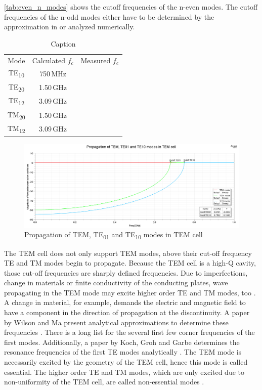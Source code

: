 \autoref{tab:even_n_modes} shows the cutoff frequencies of the n-even modes. The cutoff frequencies of the n-odd modes either have to be determined by the approximation in \cite{Wilson_Ma_1986} or analyzed numerically. 


\begin{table}[h]
    \centering
    \begin{tabular}{ccc}
        Mode & Calculated $f_c$ & Measured $f_c$\\
        TE\textsubscript{10} & 750\,MHz & \\
        TE\textsubscript{20} & 1.50\,GHz & \\
        TE\textsubscript{12} & 3.09\,GHz & \\
        TM\textsubscript{20} & 1.50\,GHz & \\
        TM\textsubscript{12} & 3.09\,GHz & \\
    \end{tabular}
    \caption{Caption}
    \label{tab:even_n_modes}
\end{table}

\begin{figure}[h]
    \centering
    \includegraphics[width=1\linewidth]{Documentation//content//10_theory//img/te01_te10_tem_propagation.png}
    \caption{Propagation of TEM, TE\textsubscript{01} and TE\textsubscript{10} modes in TEM cell}
    \label{fig:te01_te10_tem_propagation}
\end{figure}




The TEM cell does not only support TEM modes, above their cut-off frequency TE and TM modes begin to propagate. Because the TEM cell is a high-Q cavity, those cut-off frequencies are sharply defined frequencies. Due to imperfections, change in materials or finite conductivity of the conducting plates, wave propagating in the TEM mode may excite higher order TE and TM modes, too \cite{10791592}. A change in material, for example, demands the electric and magnetic field to have a component in the direction of propagation at the discontinuity. A paper by Wilson and Ma present analytical approximations to determine these frequencies \cite{Wilson_Ma_1986}.  There is a long list for the several first few corner frequencies of the first modes. Additionally, a paper by Koch, Groh and Garbe determines the resonance frequencies of the first TE modes analytically \cite{10791592}. The TEM mode is necessarily excited by the geometry of the TEM cell, hence this mode is called essential. The higher order TE and TM modes, which are only excited due to non-uniformity of the TEM cell, are called non-essential modes \cite{990711}.


